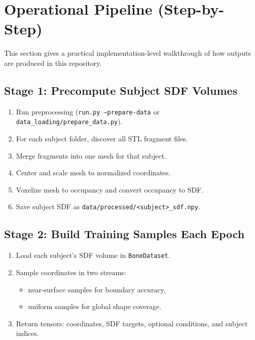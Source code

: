 ﻿\documentclass[11pt]{article}
\begin{document}
\section{Operational Pipeline (Step-by-Step)}
This section gives a practical implementation-level walkthrough of how outputs are produced in this repository.

\subsection{Stage 1: Precompute Subject SDF Volumes}
\begin{enumerate}[leftmargin=*]
    \item Run preprocessing (\texttt{run.py --prepare-data} or \texttt{data\_loading/prepare\_data.py}).
    \item For each subject folder, discover all STL fragment files.
    \item Merge fragments into one mesh for that subject.
    \item Center and scale mesh to normalized coordinates.
    \item Voxelize mesh to occupancy and convert occupancy to SDF.
    \item Save subject SDF as \texttt{data/processed/<subject>\_sdf.npy}.
\end{enumerate}

\subsection{Stage 2: Build Training Samples Each Epoch}
\begin{enumerate}[leftmargin=*]
    \item Load each subject's SDF volume in \texttt{BoneDataset}.
    \item Sample coordinates in two streams:
    \begin{itemize}[leftmargin=*]
        \item near-surface samples for boundary accuracy,
        \item uniform samples for global shape coverage.
    \end{itemize}
    \item Return tensors: coordinates, SDF targets, optional conditions, and subject indices.
\end{enumerate}
\end{document}
